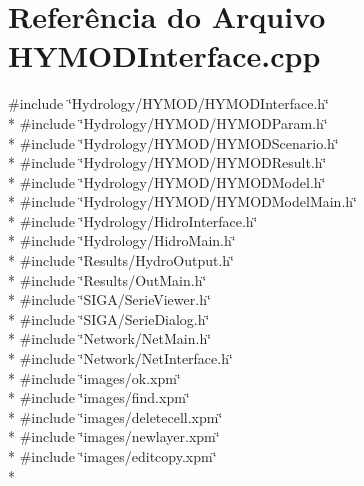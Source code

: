 \section{Referência do Arquivo H\+Y\+M\+O\+D\+Interface.\+cpp}
\label{_h_y_m_o_d_interface_8cpp}
{\ttfamily \#include \char`\"{}Hydrology/\+H\+Y\+M\+O\+D/\+H\+Y\+M\+O\+D\+Interface.\+h\char`\"{}}\\*
{\ttfamily \#include \char`\"{}Hydrology/\+H\+Y\+M\+O\+D/\+H\+Y\+M\+O\+D\+Param.\+h\char`\"{}}\\*
{\ttfamily \#include \char`\"{}Hydrology/\+H\+Y\+M\+O\+D/\+H\+Y\+M\+O\+D\+Scenario.\+h\char`\"{}}\\*
{\ttfamily \#include \char`\"{}Hydrology/\+H\+Y\+M\+O\+D/\+H\+Y\+M\+O\+D\+Result.\+h\char`\"{}}\\*
{\ttfamily \#include \char`\"{}Hydrology/\+H\+Y\+M\+O\+D/\+H\+Y\+M\+O\+D\+Model.\+h\char`\"{}}\\*
{\ttfamily \#include \char`\"{}Hydrology/\+H\+Y\+M\+O\+D/\+H\+Y\+M\+O\+D\+Model\+Main.\+h\char`\"{}}\\*
{\ttfamily \#include \char`\"{}Hydrology/\+Hidro\+Interface.\+h\char`\"{}}\\*
{\ttfamily \#include \char`\"{}Hydrology/\+Hidro\+Main.\+h\char`\"{}}\\*
{\ttfamily \#include \char`\"{}Results/\+Hydro\+Output.\+h\char`\"{}}\\*
{\ttfamily \#include \char`\"{}Results/\+Out\+Main.\+h\char`\"{}}\\*
{\ttfamily \#include \char`\"{}S\+I\+G\+A/\+Serie\+Viewer.\+h\char`\"{}}\\*
{\ttfamily \#include \char`\"{}S\+I\+G\+A/\+Serie\+Dialog.\+h\char`\"{}}\\*
{\ttfamily \#include \char`\"{}Network/\+Net\+Main.\+h\char`\"{}}\\*
{\ttfamily \#include \char`\"{}Network/\+Net\+Interface.\+h\char`\"{}}\\*
{\ttfamily \#include \char`\"{}images/ok.\+xpm\char`\"{}}\\*
{\ttfamily \#include \char`\"{}images/find.\+xpm\char`\"{}}\\*
{\ttfamily \#include \char`\"{}images/deletecell.\+xpm\char`\"{}}\\*
{\ttfamily \#include \char`\"{}images/newlayer.\+xpm\char`\"{}}\\*
{\ttfamily \#include \char`\"{}images/editcopy.\+xpm\char`\"{}}\\*
